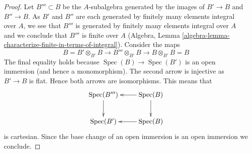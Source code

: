 \documentclass[10pt,a4paper]{amsart}
\theoremstyle{plain}
\theoremstyle{definition}
\theoremstyle{remark}
\numberwithin{equation}{subsection}
\def\Spec{\mathop{\mathrm{Spec}}}
\begin{document}
\begin{proof}
Let $B''' \subset B$ be the $A$-subalgebra generated by the images
of $B' \to B$ and $B'' \to B$. As $B'$ and $B''$ are each generated
by finitely many elements integral over $A$, we see that $B'''$ is
generated by finitely many elements integral over $A$ and we conclude
that $B'''$ is finite over $A$
(Algebra, Lemma \ref{algebra-lemma-characterize-finite-in-terms-of-integral}).
Consider the maps
$$
B = B' \otimes_{B'} B \to B''' \otimes_{B'} B \to B \otimes_{B'} B = B
$$
The final equality holds because $\Spec(B) \to \Spec(B')$ is an
open immersion (and hence a monomorphism). The second arrow is injective
as $B' \to B$ is flat. Hence both arrows are isomorphisms.
This means that
$$
\xymatrix{
\Spec(B''') \ar[d] & \Spec(B) \ar[d] \ar[l] \\
\Spec(B') & \Spec(B) \ar[l]
}
$$
is cartesian. Since the base change of an open immersion is an
open immersion we conclude.
\end{proof}
\end{document}
